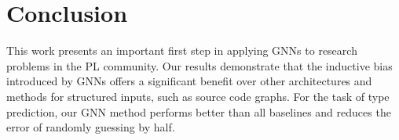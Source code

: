\section{Conclusion}
\label{sec:conclusions}

This work presents an important first step in applying GNNs to research problems in the PL community. Our results demonstrate that the inductive bias introduced by GNNs offers a significant benefit over other architectures and methods for structured inputs, such as source code graphs. For the task of type prediction, our GNN method performs better than all baselines and reduces the error of randomly guessing by half. 



